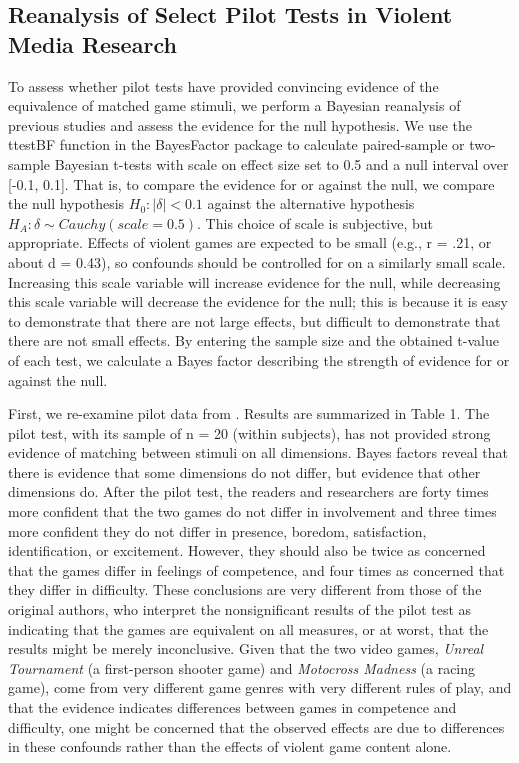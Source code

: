 \documentclass[fignum,nobf,man]{apa}
\begin{document}
\subsection{Reanalysis of Select Pilot Tests in Violent Media Research}
To assess whether pilot tests have provided convincing evidence of the equivalence of matched game stimuli, we perform a Bayesian reanalysis of previous studies and assess the evidence for the null hypothesis. We use the ttestBF function in the BayesFactor package \citep{Morey:Rouder:2012} to calculate paired-sample or two-sample Bayesian t-tests with scale on effect size set to 0.5 and a null interval over [-0.1, 0.1]. That is, to compare the evidence for or against the null, we compare the null hypothesis $H_0: |\delta| < 0.1$ against the alternative hypothesis $H_A: \delta \sim Cauchy(scale = 0.5)$. This choice of scale is subjective, but appropriate. Effects of violent games are expected to be small (e.g., r = .21, or about d = 0.43), so confounds should be controlled for on a similarly small scale. Increasing this scale variable will increase evidence for the null, while decreasing this scale variable will decrease the evidence for the null; this is because it is easy to demonstrate that there are not large effects, but difficult to demonstrate that there are not small effects. By entering the sample size and the obtained t-value of each test, we calculate a Bayes factor describing the strength of evidence for or against the null.  

First, we re-examine pilot data from \citet{Arriaga:etal:2008}. Results are summarized in Table 1. The pilot test, with its sample of n = 20 (within subjects), has not provided strong evidence of matching between stimuli on all dimensions. Bayes factors reveal that there is evidence that some dimensions do not differ, but evidence that other dimensions do. After the pilot test, the readers and researchers are forty times more confident that the two games do not differ in involvement and three times more confident they do not differ in presence, boredom, satisfaction, identification, or excitement. However, they should also be twice as concerned that the games differ in feelings of competence, and four times as concerned that they differ in difficulty. These conclusions are very different from those of the original authors, who interpret the nonsignificant results of the pilot test as indicating that the games are equivalent on all measures, or at worst, that the results might be merely inconclusive. Given that the two video games, {\em Unreal Tournament} (a first-person shooter game) and {\em Motocross Madness} (a racing game), come from very different game genres with very different rules of play, and that the evidence indicates differences between games in competence and difficulty, one might be concerned that the observed effects are due to differences in these confounds rather than the effects of violent game content alone.
\end{document}
